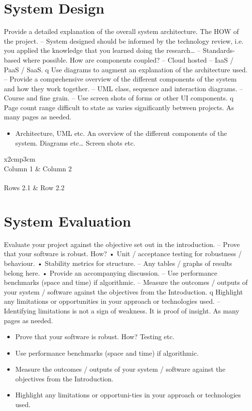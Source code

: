 \chapter{System Design}
Provide a detailed explanation of the overall system
architecture. The HOW of the project.
– System designed should be informed by the technology review, i.e.
you applied the knowledge that you learned doing the research…
– Standards-based where possible. How are components coupled?
– Cloud hosted – IaaS / PaaS / SaaS.
q Use diagrams to augment an explanation of the architecture
used.
– Provide a comprehensive overview of the different components of
the system and how they work together.
– UML class, sequence and interaction diagrams.
– Course and fine grain.
– Use screen shots of forms or other UI components.
q Page count range difficult to state as varies significantly
between projects.
As many pages as needed.
\begin{itemize}
\item Architecture, UML etc. An overview of the different components of the system. Diagrams etc… Screen shots etc.
\end{itemize}

\begin{table}[h]
  \centering
  \begin{tabular}{x{2cm}p{3cm}}
    \toprule \\
    Column 1 & Column 2 \\
    \midrule \\
    Rows 2.1 & Row 2.2 \\
    \bottomrule
  \end{tabular}
  \caption{A table.}
  \label{table:mytable}
\end{table}

\chapter{System Evaluation}
Evaluate your project against the objective set out in the
introduction.
– Prove that your software is robust. How?
• Unit / acceptance testing for robustness / behaviour.
• Stability metrics for structure.
– Any tables / graphs of results belong here.
• Provide an accompanying discussion.
– Use performance benchmarks (space and time) if algorithmic.
– Measure the outcomes / outputs of your system / software against
the objectives from the Introduction.
q Highlight any limitations or opportunities in your approach or
technologies used.
– Identifying limitations is not a sign of weakness. It is proof of
insight.
As many pages as needed.
\begin{itemize}
\item Prove that your software is robust. How? Testing etc. 
\item Use performance benchmarks (space and time) if algorithmic.
\item Measure the outcomes / outputs of your system / software against the objectives from the Introduction.
\item Highlight any limitations or opportuni-ties in your approach or technologies used.
\end{itemize}

